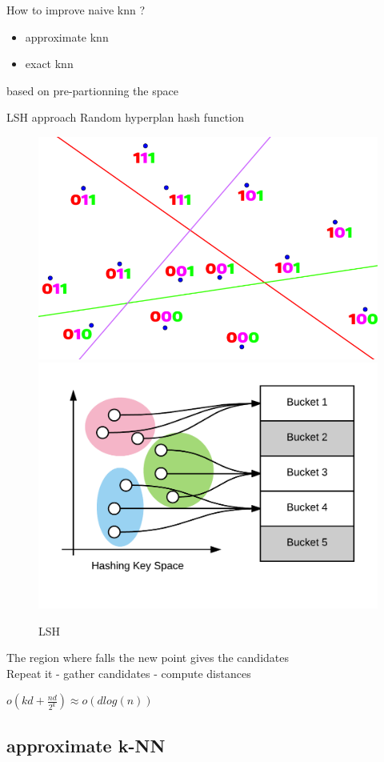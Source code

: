 \documentclass[11 pt]{beamer}
\begin{document}
\begin{frame}{How to improve naive knn ?}
\begin{itemize}
	\item approximate knn
	\item exact knn
\end{itemize}

\textrightarrow based on pre-partionning the space
\end{frame}
%

\begin{frame}{LSH approach}
Random hyperplan \textrightarrow hash function
\begin{figure}
	\centering
	\includegraphics[width=.45\textwidth]{figures/lsh.png}
	\includegraphics[width=.45\textwidth]{figures/lsh2.png}
	\caption{LSH}
	\label{fig:lsh2}
\end{figure}

The region where falls the new point gives the candidates
\\
Repeat it - gather candidates - compute distances

$o(kd + \frac{nd}{2^k})\approx o(dlog(n))$


\end{frame}
\subsection{approximate k-NN}
\end{document}
